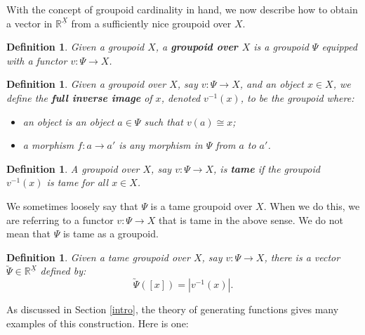 \documentclass{article}
\renewcommand{\to}{\rightarrow}
\newcommand{\maps}{\colon}
\newcommand{\R}{{\mathbb R}}
\renewcommand{\u}[1]{\underline{#1}}
\newtheorem{definition}[thm]{Definition}
\begin{document}
With the concept of groupoid cardinality in hand, we now describe
how to obtain a vector in $\R^{\u{X}}$ from a sufficiently nice 
groupoid over $X$.  

\begin{definition}
Given a groupoid $X$, a {\bf groupoid over $X$} is a groupoid $\Psi$ 
equipped with a functor $v \maps \Psi \to X$.
\end{definition}
\begin{definition}
Given a groupoid over $X$, say $v \maps \Psi \to X$, and an object $x \in X$,
we define the {\bf full inverse image} of $x$,
denoted $v^{-1}(x)$, to be the groupoid where:
\begin{itemize}
\item
an object is an object $a \in \Psi$ such that $v(a) \cong x$;
\item
a morphism $f \maps a \to a'$ is any morphism in $\Psi$ from $a$ to
$a'$.
\end{itemize}
\end{definition}
\begin{definition}
A groupoid over $X$, say $v \maps \Psi \to X$, is {\bf tame} if the 
groupoid $v^{-1}(x)$ is tame for all $x \in X$. 
\end{definition}

\noindent 
We sometimes loosely say that $\Psi$ is a tame groupoid over $X$.
When we do this, we are referring to a functor $v \maps \Psi \to X$
that is tame in the above sense.  We do not mean that $\Psi$ is tame
as a groupoid.

\begin{definition}
\label{degroupoidification_of_vectors}
Given a tame groupoid over $X$, say $v \maps \Psi\to X$, 
there is a vector $\utilde{\Psi} \in \R^{\u{X}}$ 
defined by:
\[ \utilde{\Psi}([x]) = |v^{-1}(x)|. \]
\end{definition}

\noindent
As discussed in Section \ref{intro}, the theory of generating functions
gives many examples of this construction.  Here is one:
\end{document}
